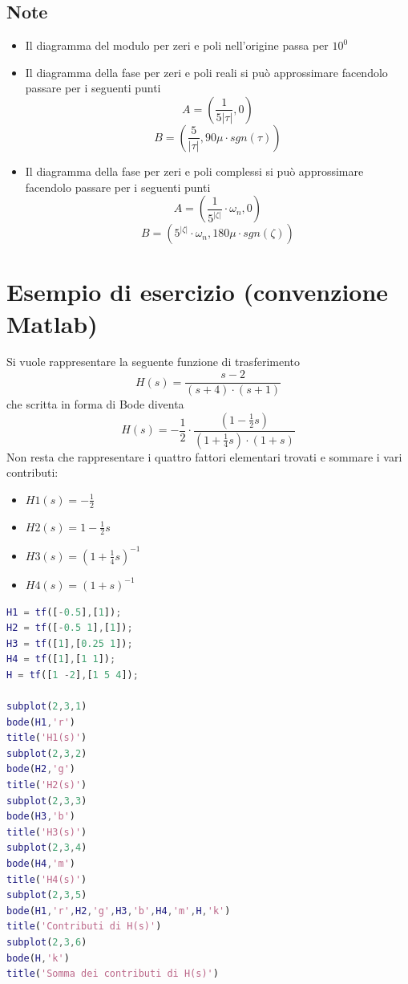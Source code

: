 \documentclass[a4paper,oneside,titlepage]{book}
\begin{document}
\subsection{Note}
\begin{itemize}
\item Il diagramma del modulo per zeri e poli nell'origine passa per $10^0$

\item Il diagramma della fase per zeri e poli reali si può approssimare facendolo passare per i seguenti punti
\[ A = \left( \frac{1}{5|\tau|}, 0 \right) \]
\[ B = \left( \frac{5}{|\tau|}, 90 \mu \cdot sgn(\tau) \right) \]

\item Il diagramma della fase per zeri e poli complessi si può approssimare facendolo passare per i seguenti punti
\[ A = \left( \frac{1}{5^{|\zeta|}} \cdot \omega_n, 0 \right) \]
\[ B = \left( 5^{|\zeta|} \cdot \omega_n, 180 \mu \cdot sgn(\zeta) \right) \]
\end{itemize}

\section{Esempio di esercizio (convenzione Matlab)}
Si vuole rappresentare la seguente funzione di trasferimento
\[ H(s) = \frac{s-2}{(s+4) \cdot (s+1)} \]
che scritta in forma di Bode diventa
\[ H(s) = - \frac{1}{2} \cdot \frac{\left( 1 - \frac{1}{2} s \right)}{\left( 1 + \frac{1}{4} s \right) \cdot (1+s)} \]
Non resta che rappresentare i quattro fattori elementari trovati e sommare i vari contributi:
\begin{itemize}
\item $H1(s) = - \frac{1}{2}$
\item $H2(s) = 1 - \frac{1}{2} s$
\item $H3(s) = \left( 1 + \frac{1}{4} s \right)^{-1}$
\item $H4(s) = (1+s)^{-1}$
\end{itemize}
\newpage
\begin{lstlisting}[language=Matlab, caption=Codice Matlab]
H1 = tf([-0.5],[1]);
H2 = tf([-0.5 1],[1]);
H3 = tf([1],[0.25 1]);
H4 = tf([1],[1 1]);
H = tf([1 -2],[1 5 4]);

subplot(2,3,1)
bode(H1,'r')
title('H1(s)')
subplot(2,3,2)
bode(H2,'g')
title('H2(s)')
subplot(2,3,3)
bode(H3,'b')
title('H3(s)')
subplot(2,3,4)
bode(H4,'m')
title('H4(s)')
subplot(2,3,5)
bode(H1,'r',H2,'g',H3,'b',H4,'m',H,'k')
title('Contributi di H(s)')
subplot(2,3,6)
bode(H,'k')
title('Somma dei contributi di H(s)')
\end{lstlisting}
\end{document}
